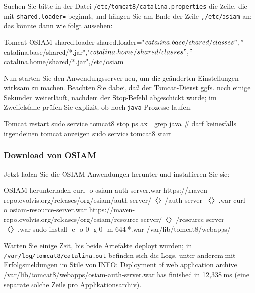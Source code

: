 \begin{minipage}{\linewidth}
Suchen Sie bitte in der Datei \texttt{/etc/tomcat8/catalina.properties}
die Zeile, die mit \texttt{shared.loader=} beginnt, und hängen Sie am
Ende der Zeile \texttt{,/etc/osiam} an; das könnte dann wie folgt aussehen:

\begin{lstdump}{Tomcat OSIAM shared.loader}
shared.loader="${catalina.base}/shared/classes","${catalina.base}/shared/*.jar","${catalina.home}/shared/classes","${catalina.home}/shared/*.jar",/etc/osiam
\end{lstdump}
\end{minipage}

Nun starten Sie den Anwendungsserver neu, um die geänderten
Einstellungen wirksam zu machen. Beachten Sie dabei, daß der
Tomcat-Dienst ggfs. noch einige Sekunden weiterläuft, nachdem
der Stop-Befehl abgeschickt wurde; im Zweifelsfalle prüfen Sie
explizit, ob noch \texttt{java}-Prozesse laufen.\keinumbruch

\begin{minipage}{\linewidth}
\begin{lstdump}{Tomcat restart}
sudo service tomcat8 stop
ps ax | grep java # darf keinesfalls irgendeinen tomcat anzeigen
sudo service tomcat8 start
\end{lstdump}
\end{minipage}

\subsubsection{Download von OSIAM}\label{subsubsec:setup-osiam-download}

\begin{minipage}{\linewidth}
Jetzt laden Sie die OSIAM-Anwendungen herunter und installieren Sie sie:

\begin{lstdump}{OSIAM herunterladen}
curl -o osiam-auth-server.war https://maven-repo.evolvis.org/releases/org/osiam/auth-server/〈\lstdumpesc{\vwiaversosiam}〉/auth-server-〈\lstdumpesc{\vwiaversosiam}〉.war
curl -o osiam-resource-server.war https://maven-repo.evolvis.org/releases/org/osiam/resource-server/〈\lstdumpesc{\vwiaversosiam}〉/resource-server-〈\lstdumpesc{\vwiaversosiam}〉.war
sudo install -c -o 0 -g 0 -m 644 *.war /var/lib/tomcat8/webapps/
\end{lstdump}
\end{minipage}

Warten Sie einige Zeit, bis beide Artefakte deployt wurden; in
\texttt{/var/log/tomcat8/catalina.out} befinden sich die Logs,
unter anderem mit Erfolgsmeldungen im Stile von {\ttfamily
INFO: Deployment of web application archive
/var/lib/tomcat8/webapps/osiam-auth-server.war has finished
in 12,338 ms} (eine separate solche Zeile pro Applikationsarchiv).

